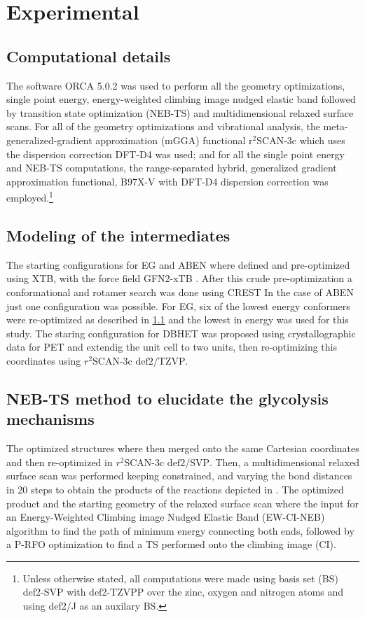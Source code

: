 \section{Experimental}
\label{sec:Experimental}

\subsection{Computational details}
\label{subsec:ex:CompDetails}
The software ORCA 5.0.2 \cite{Neese2022} was used to perform all the geometry optimizations, single point energy, energy-weighted climbing image nudged elastic band followed by transition state optimization (NEB-TS) and multidimensional relaxed surface scans.
For all of the geometry optimizations and vibrational analysis, the meta-generalized-gradient approximation (mGGA) functional $\textrm{r}^2\textrm{SCAN-3c}$ which uses the dispersion correction DFT-D4 \cite{Caldeweyher2020} was used; and for all the single point energy and NEB-TS computations, the range-separated hybrid, generalized gradient approximation functional, \chemomega B97X-V with DFT-D4 dispersion correction was employed.\footnote{Unless otherwise stated, all computations were made using basis set (BS) def2-SVP with def2-TZVPP over the zinc, oxygen and nitrogen atoms and using def2/J as an auxilary BS.}

\subsection{Modeling of the intermediates}
\label{subsec:ex:ModIntermed}
The starting configurations for EG and ABEN where defined and pre-optimized using XTB, \cite{Bannwarth2021} with the force field GFN2-xTB \cite{Bannwarth2019}. After this crude pre-optimization a conformational and rotamer search was done using CREST \cite{Pracht2020}
In the case of ABEN just one configuration was possible. For EG, six of the lowest energy conformers were re-optimized as described in \ref{subsec:ex:CompDetails} and the lowest in energy was used for this study. The staring configuration for DBHET was proposed using crystallographic data for PET \cite{Daubeny1954} and extendig the unit cell to two units, then re-optimizing this coordinates using $r^2\textrm{SCAN-3c}\textrm{ def2/TZVP}$.

\subsection{NEB-TS method to elucidate the glycolysis mechanisms}
\label{subsec:ex:NEB-TS}
The optimized structures where then merged onto the same Cartesian coordinates and then re-optimized in $r^2\textrm{SCAN-3c}\textrm{ def2/SVP}$. Then, a multidimensional relaxed surface scan was performed keeping constrained, and varying the bond distances in 20 steps to obtain the products of the reactions depicted in . The optimized product and the starting geometry of the relaxed surface scan where the input for an Energy-Weighted Climbing image Nudged Elastic Band (EW-CI-NEB) \cite{Asgeirsson2021} algorithm to find the path of minimum energy connecting both ends, followed by a P-RFO optimization to find a TS performed onto the climbing image (CI).

